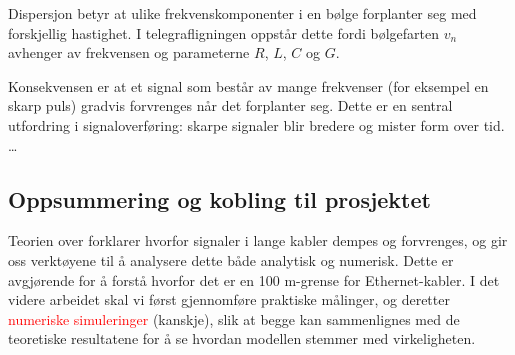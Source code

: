 Dispersjon betyr at ulike frekvenskomponenter i en bølge forplanter seg med forskjellig hastighet. 
I telegrafligningen oppstår dette fordi bølgefarten $v_n$ avhenger av frekvensen og parameterne 
$R$, $L$, $C$ og $G$. 

Konsekvensen er at et signal som består av mange frekvenser (for eksempel en skarp puls) gradvis 
forvrenges når det forplanter seg. Dette er en sentral utfordring i signaloverføring: skarpe signaler 
blir bredere og mister form over tid. 
\dots

\subsection{Oppsummering og kobling til prosjektet}

Teorien over forklarer hvorfor signaler i lange kabler dempes og forvrenges, og gir oss verktøyene til å analysere dette både analytisk og numerisk. Dette er avgjørende for å forstå hvorfor det er en 100 m-grense for Ethernet-kabler. I det videre arbeidet skal vi først gjennomføre praktiske målinger, og deretter \textcolor{red}{numeriske simuleringer} (kanskje), slik at begge kan sammenlignes med de teoretiske resultatene for å se hvordan modellen stemmer med virkeligheten.
